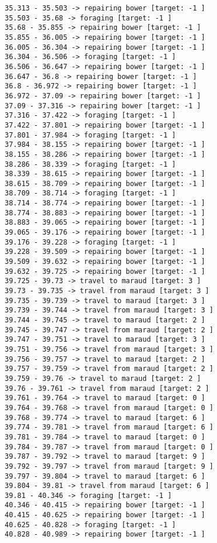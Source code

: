 \documentclass[11pt]{article}
\begin{document}
\begin{Verbatim}[commandchars=\\\{\}]
35.313 - 35.503 -> repairing bower [target: -1 ]
35.503 - 35.68 -> foraging [target: -1 ]
35.68 - 35.855 -> repairing bower [target: -1 ]
35.855 - 36.005 -> repairing bower [target: -1 ]
36.005 - 36.304 -> repairing bower [target: -1 ]
36.304 - 36.506 -> foraging [target: -1 ]
36.506 - 36.647 -> repairing bower [target: -1 ]
36.647 - 36.8 -> repairing bower [target: -1 ]
36.8 - 36.972 -> repairing bower [target: -1 ]
36.972 - 37.09 -> repairing bower [target: -1 ]
37.09 - 37.316 -> repairing bower [target: -1 ]
37.316 - 37.422 -> foraging [target: -1 ]
37.422 - 37.801 -> repairing bower [target: -1 ]
37.801 - 37.984 -> foraging [target: -1 ]
37.984 - 38.155 -> repairing bower [target: -1 ]
38.155 - 38.286 -> repairing bower [target: -1 ]
38.286 - 38.339 -> foraging [target: -1 ]
38.339 - 38.615 -> repairing bower [target: -1 ]
38.615 - 38.709 -> repairing bower [target: -1 ]
38.709 - 38.714 -> foraging [target: -1 ]
38.714 - 38.774 -> repairing bower [target: -1 ]
38.774 - 38.883 -> repairing bower [target: -1 ]
38.883 - 39.065 -> repairing bower [target: -1 ]
39.065 - 39.176 -> repairing bower [target: -1 ]
39.176 - 39.228 -> foraging [target: -1 ]
39.228 - 39.509 -> repairing bower [target: -1 ]
39.509 - 39.632 -> repairing bower [target: -1 ]
39.632 - 39.725 -> repairing bower [target: -1 ]
39.725 - 39.73 -> travel to maraud [target: 3 ]
39.73 - 39.735 -> travel from maraud [target: 3 ]
39.735 - 39.739 -> travel to maraud [target: 3 ]
39.739 - 39.744 -> travel from maraud [target: 3 ]
39.744 - 39.745 -> travel to maraud [target: 2 ]
39.745 - 39.747 -> travel from maraud [target: 2 ]
39.747 - 39.751 -> travel to maraud [target: 3 ]
39.751 - 39.756 -> travel from maraud [target: 3 ]
39.756 - 39.757 -> travel to maraud [target: 2 ]
39.757 - 39.759 -> travel from maraud [target: 2 ]
39.759 - 39.76 -> travel to maraud [target: 2 ]
39.76 - 39.761 -> travel from maraud [target: 2 ]
39.761 - 39.764 -> travel to maraud [target: 0 ]
39.764 - 39.768 -> travel from maraud [target: 0 ]
39.768 - 39.774 -> travel to maraud [target: 6 ]
39.774 - 39.781 -> travel from maraud [target: 6 ]
39.781 - 39.784 -> travel to maraud [target: 0 ]
39.784 - 39.787 -> travel from maraud [target: 0 ]
39.787 - 39.792 -> travel to maraud [target: 9 ]
39.792 - 39.797 -> travel from maraud [target: 9 ]
39.797 - 39.804 -> travel to maraud [target: 6 ]
39.804 - 39.81 -> travel from maraud [target: 6 ]
39.81 - 40.346 -> foraging [target: -1 ]
40.346 - 40.415 -> repairing bower [target: -1 ]
40.415 - 40.625 -> repairing bower [target: -1 ]
40.625 - 40.828 -> foraging [target: -1 ]
40.828 - 40.989 -> repairing bower [target: -1 ]

\end{Verbatim}
\end{document}
